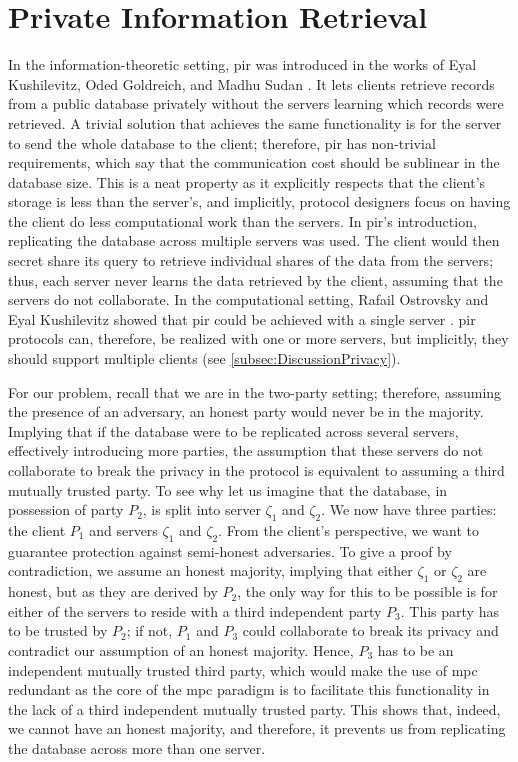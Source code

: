 \section{Private Information Retrieval}
\label{sec:pir}

In the information-theoretic setting, \acrshort{pir} was introduced in the works of Eyal Kushilevitz, Oded Goldreich, and Madhu Sudan \cite{FOCS:CGKS95}. It lets clients retrieve records from a public database privately without the servers learning which records were retrieved. A trivial solution that achieves the same functionality is for the server to send the whole database to the client; therefore, \acrshort{pir} has non-trivial requirements, which say that the communication cost should be sublinear in the database size. This is a neat property as it explicitly respects that the client's storage is less than the server's, and implicitly, protocol designers focus on having the client do less computational work than the servers. In \acrshort{pir}'s introduction, replicating the database across multiple servers was used. The client would then secret share its query to retrieve individual shares of the data from the servers; thus, each server never learns the data retrieved by the client, assuming that the servers do not collaborate. In the computational setting, Rafail Ostrovsky and Eyal Kushilevitz showed that \acrshort{pir} could be achieved with a single server \cite{FOCS:KusOst97}. \acrshort{pir} protocols can, therefore, be realized with one or more servers, but implicitly, they should support multiple clients (see \cref{subsec:DiscussionPrivacy}).  

For our problem, recall that we are in the two-party setting; therefore, assuming the presence of an adversary, an honest party would never be in the majority. Implying that if the database were to be replicated across several servers, effectively introducing more parties, the assumption that these servers do not collaborate to break the privacy in the protocol is equivalent to assuming a third mutually trusted party. To see why let us imagine that the database, in possession of party $ P_2 $, is split into server $ \zeta_1 $ and $ \zeta_2 $. We now have three parties: the client $ P_1 $ and servers $ \zeta_1 $ and $ \zeta_2 $. From the client's perspective, we want to guarantee protection against semi-honest adversaries. To give a proof by contradiction, we assume an honest majority, implying that either $ \zeta_1 $ or $ \zeta_2 $ are honest, but as they are derived by $ P_2 $, the only way for this to be possible is for either of the servers to reside with a third independent party $ P_3 $. This party has to be trusted by $ P_2 $; if not, $ P_1 $ and $ P_3 $ could collaborate to break its privacy and contradict our assumption of an honest majority. Hence, $ P_3 $ has to be an independent mutually trusted third party, which would make the use of \acrshort{mpc} redundant as the core of the \acrshort{mpc} paradigm is to facilitate this functionality in the lack of a third independent mutually trusted party. This shows that, indeed, we cannot have an honest majority, and therefore, it prevents us from replicating the database across more than one server.

